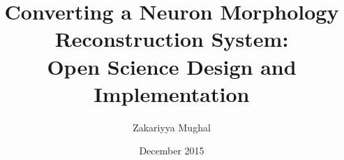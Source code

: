 \title{\bf \large Converting a Neuron Morphology Reconstruction
System:\\Open Science Design and Implementation}
\author{Zakariyya Mughal}
\date{December 2015}



